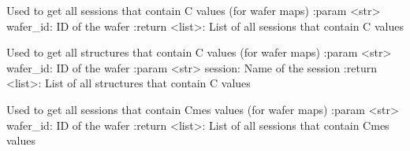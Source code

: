 \documentclass[letterpaper,10pt,english]{sphinxmanual}
\begin{document}
\begin{fulllineitems}
\label{\detokenize{getter:getter.get_C_sessions}}
\pysigstartsignatures
{}
\pysigstopsignatures
\sphinxAtStartPar
Used to get all sessions that contain C values (for wafer maps)
:param \textless{}str\textgreater{} wafer\_id: ID of the wafer
:return \textless{}list\textgreater{}: List of all sessions that contain C values

\end{fulllineitems}


\begin{fulllineitems}
\label{\detokenize{getter:getter.get_C_structures}}
\pysigstartsignatures
{}
\pysigstopsignatures
\sphinxAtStartPar
Used to get all structures that contain C values (for wafer maps)
:param \textless{}str\textgreater{} wafer\_id: ID of the wafer
:param \textless{}str\textgreater{} session: Name of the session
:return \textless{}list\textgreater{}: List of all structures that contain C values

\end{fulllineitems}


\begin{fulllineitems}
\label{\detokenize{getter:getter.get_Cmes_sessions}}
\pysigstartsignatures
{}
\pysigstopsignatures
\sphinxAtStartPar
Used to get all sessions that contain Cmes values (for wafer maps)
:param \textless{}str\textgreater{} wafer\_id: ID of the wafer
:return \textless{}list\textgreater{}: List of all sessions that contain Cmes values

\end{fulllineitems}

\end{document}
